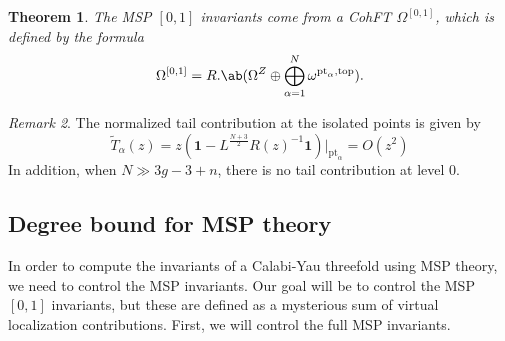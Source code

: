 \documentclass[10pt]{amsart}
\newtheorem{thm}{Theorem}[section]
\theoremstyle{definition}
\theoremstyle{remark}
\newtheorem{rmk}[thm]{Remark}
\theoremstyle{plain}
\theoremstyle{definition}
\theoremstyle{remark}
\newcommand{\mr}[1]{\mathrm{#1}}
\newcommand{\1}{\mathbf{1}}
\newcommand{\2}{\mathbf{2}}
\newcommand{\3}{\mathbf{3}}
\newcommand{\pt}{\mr{pt}}
\begin{document}
\begin{thm}
    The MSP $[0,1]$ invariants come from a CohFT $\Omega^{[0,1]}$, which is defined by the formula
    \[ \Omega^{[0,1]} = R . \ab(\Omega^Z \oplus \bigoplus_{\alpha=1}^N \omega^{\pt_{\alpha},\mr{top}}). \]
\end{thm}

\begin{rmk}
    The normalized tail contribution at the isolated points is given by
    \[ \tilde{T}_{\alpha}(z) = z (\1-L^{\frac{N+3}{2}} R(z)^{-1}\1) |_{\pt_{\alpha}} = O(z^2) \]
     In addition, when $N \gg 3g-3+n$, there is no tail contribution at level $0$.
\end{rmk}

\subsection{Degree bound for MSP theory}%
\label{sub:Degree bound for MSP theory}

In order to compute the invariants of a Calabi-Yau threefold using MSP theory, we need to control the MSP invariants. Our goal will be to control the MSP $[0,1]$ invariants, but these are defined as a mysterious sum of virtual localization contributions. First, we will control the full MSP invariants.
\end{document}
